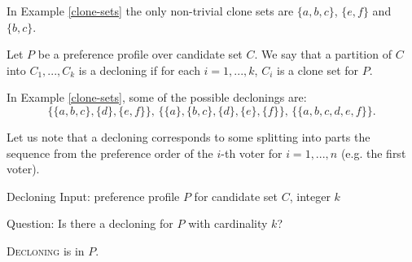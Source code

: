 \begin{exmp}
In Example \ref{clone-sets} the only non-trivial clone sets are
$\{a,b,c\}$, $\{e,f\}$ and $\{b,c\}$.
\end{exmp}

\begin{defn}[decloning]
Let $P$ be a preference profile over candidate set $C$.
We say that a partition of $C$ into $C_1, ..., C_k$ is a decloning
if for each $i=1,...,k$, $C_i$ is a clone set for $P$.
\end{defn}

\begin{exmp}
In Example \ref{clone-sets}, some of the possible declonings are:
$$
\big\{ \{a,b,c\}, \{d\}, \{e,f\} \big\} \text{, }
\big\{ \{a\}, \{b,c\}, \{d\}, \{e\}, \{f\} \big\} \text{, }
\big\{ \{a,b,c,d,e,f\} \big\} \text{.}
$$
\end{exmp}

\begin{rmrk} \label{sequence-split}
Let us note that a decloning corresponds to some splitting into parts
the sequence from the preference order of the $i$-th voter for $i=1,...,n$ (e.g. the first voter).
\end{rmrk}


\begin{problem}{Decloning}
    Input: preference profile $P$ for candidate set $C$, integer $k$

    Question: Is there a decloning for $P$ with cardinality $k$?
\end{problem}

\begin{thm}
\textsc{Decloning} is in $P$.
\end{thm}

